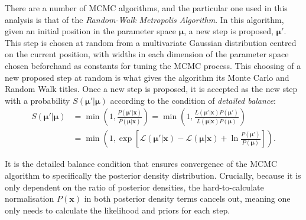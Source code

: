 There are a number of MCMC algorithms, and the particular one used in this analysis is that of the \textit{Random-Walk Metropolis Algorithm}. In this algorithm, given an initial position in the parameter space $\bm{\mu}$, a new step is proposed, $\bm{\mu}'$. This step is chosen at random from a multivariate Gaussian distribution centred on the current position, with widths in each dimension of the parameter space chosen beforehand as constants for tuning the MCMC process. This choosing of a new proposed step at random is what gives the algorithm its Monte Carlo and Random Walk titles. Once a new step is proposed, it is accepted as the new step with a probability $S\left(\bm{\mu}'|\bm{\mu}\right)$ according to the condition of \textit{detailed balance}:
\begin{align}
    S\left(\bm{\mu}'|\bm{\mu}\right) &= 
    \min{\left(
        1,
        \frac{P\left(\bm{\mu}'|\bm{x}\right)}{P\left(\bm{\mu}|\bm{x}\right)}
        \right)
        } = 
    \min{\left(
        1,
        \frac{L\left(\bm{\mu}'|\bm{x}\right)P\left(\bm{\mu}'\right)}{L\left(\bm{\mu}|\bm{x}\right)P\left(\bm{\mu}\right)}
        \right)
    }\nonumber\\
    &= \min{\left(
        1,
        \exp{\left[\mathcal{L}\left(\bm{\mu}'|\bm{x}\right)-\mathcal{L}\left(\bm{\mu}|\bm{x}\right)+\ln{\frac{P\left(\bm{\mu}'\right)}{P\left(\bm{\mu}\right)}}\right]}
        \right)
    }.
\end{align}

It is the detailed balance condition that ensures convergence of the MCMC algorithm to specifically the posterior density distribution. Crucially, because it is only dependent on the ratio of posterior densities, the hard-to-calculate normalisation $P\left(\bm{x}\right)$ in both posterior density terms cancels out, meaning one only needs to calculate the likelihood and priors for each step.

